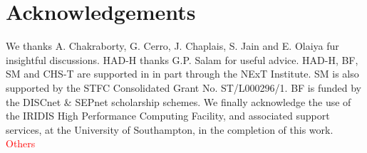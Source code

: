 \documentclass[12pt]{article}
\begin{document}
    \section{Acknowledgements}
We thanks A. Chakraborty, 
G. Cerro, 
J. Chaplais, 
S. Jain and 
E. Olaiya fur insightful discussions. HAD-H thanks
G.P. Salam for useful advice. 
HAD-H, BF, SM and CHS-T are supported in  in part through the NExT Institute.
SM is also supported by the STFC Consolidated
Grant No. ST/L000296/1. BF is funded by the DISCnet \& SEPnet scholarship schemes.
We finally 
acknowledge the use of the IRIDIS High Performance Computing Facility, and associated
support services, at the University of Southampton, in the completion of this work.
{\textcolor{red}{Others}}

\printbibliography
\end{document}
